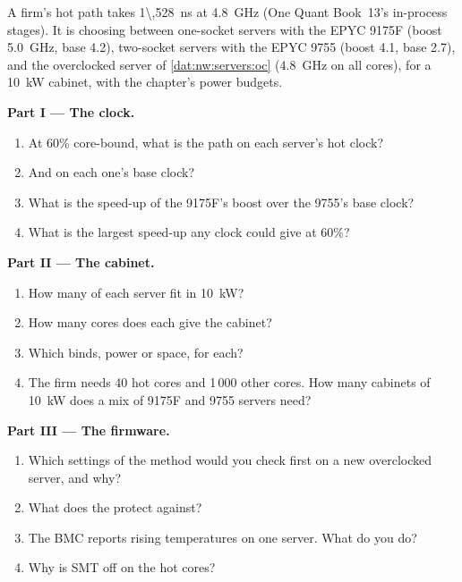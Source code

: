 \begin{problem}\label{pb:nw:servers:1}
A firm's hot path takes \qty{1\,528}{\nano\second} at 4.8~GHz (One Quant Book~13's in-process stages). It is choosing between one-socket
servers with the EPYC 9175F (boost 5.0~GHz, base 4.2), two-socket servers with the EPYC 9755 (boost 4.1, base 2.7), and the overclocked
server of \cref{dat:nw:servers:oc} (4.8~GHz on all cores), for a \qty{10}{\kilo\watt} cabinet, with the chapter's power budgets.

\medskip\noindent\textbf{Part I --- The clock.}
\begin{enumerate}
\item At 60\% core-bound, what is the path on each server's hot clock?
\item And on each one's base clock?
\item What is the speed-up of the 9175F's boost over the 9755's base clock?
\item What is the largest speed-up any clock could give at 60\%?
\end{enumerate}

\medskip\noindent\textbf{Part II --- The cabinet.}
\begin{enumerate}[resume]
\item How many of each server fit in \qty{10}{\kilo\watt}?
\item How many cores does each give the cabinet?
\item Which binds, power or space, for each?
\item The firm needs 40 hot cores and 1\,000 other cores. How many cabinets of \qty{10}{\kilo\watt} does a mix of 9175F and 9755 servers need?
\end{enumerate}

\medskip\noindent\textbf{Part III --- The firmware.}
\begin{enumerate}[resume]
\item Which settings of the method would you check first on a new overclocked server, and why?
\item What does the  protect against?
\item The BMC reports rising temperatures on one server. What do you do?
\item Why is SMT off on the hot cores?
\end{enumerate}


\end{problem}
